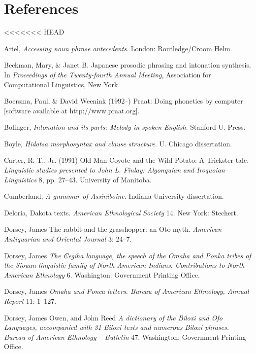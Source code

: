 \documentclass[output=paper]{LSP/langsci}
\begin{document}
\section*{References}

<<<<<<< HEAD

\printbibliography[heading=subbibliography,notkeyword=this]

\begin{reflist}

Ariel, \citet{Mira1990} \emph{Accessing noun phrase antecedents}. London: Routledge/Croom Helm. 

Beckman, Mary, \& Janet B. \citet{Pierrehumbert1986} Japanese prosodic phrasing and intonation synthesis. In \emph{Proceedings of the Twenty-fourth Annual Meeting}, Association for Computational Linguistics, New York.

Boersma, Paul, \& David Weenink (1992--) Praat: Doing phonetics by computer [software available at http://www.praat.org].

Bolinger, \citet{Dwight1986} \emph{Intonation and its parts: Melody in spoken English}. Stanford U. Press.

Boyle, \citet{John2007} \emph{Hidatsa morphosyntax and clause structure}. U. Chicago dissertation.

Carter, R. T., Jr. (1991) Old Man Coyote and the Wild Potato: A Trickster tale. \emph{Linguistic studies presented to John L. Finlay: Algonquian and Iroquoian Linguistics} 8, pp. 27--43. University of Manitoba.

Cumberland, \citet{Linda2005} \emph{A grammar of Assiniboine}. Indiana University dissertation.

Deloria, \citet{Ella1932} Dakota texts. \emph{American Ethnological Society} 14. New York: Stechert.

Dorsey, James \citet{Owen1880} The rabbit and the grasshopper: an Oto myth. \emph{American Antiquarian and Oriental Journal} 3: 24--7.

Dorsey, James \citet{Owen1890} \emph{The ₡egiha language, the speech of the Omaha and Ponka tribes of the Siouan linguistic family of North American Indians. Contributions to North American Ethnology} 6. Washington: Government Printing Office.

Dorsey, James \citet{Owen1891} \emph{Omaha and Ponca letters. Bureau of American Ethnology, Annual Report} 11: 1--127.

Dorsey, James Owen, and John Reed \citet{Swanton1912} \emph{A dictionary of the Biloxi and Ofo Languages, accompanied with 31 Biloxi texts and numerous Biloxi phrases. Bureau of American Ethnology -- Bulletin} 47. Washington: Government Printing Office.


\end{reflist}
\end{document}
